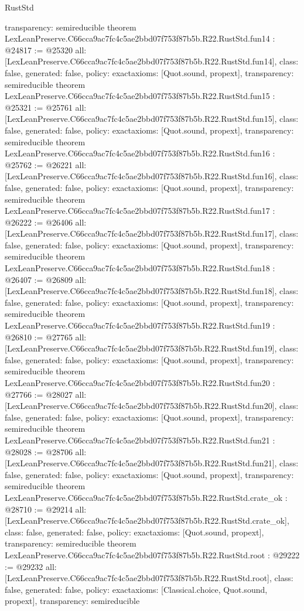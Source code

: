 \begin{lexlean}{RustStd}
\begin{coremodule}
{  transparency: semireducible
}
theorem LexLeanPreserve.C66cca9ac7fc4c5ae2bbd07f753f87b5b.R22.RustStd.fun14 : @24817 := @25320 {
  all: [LexLeanPreserve.C66cca9ac7fc4c5ae2bbd07f753f87b5b.R22.RustStd.fun14],
  class: false,
  generated: false,
  policy: exact{axioms: [Quot.sound, propext]},
  transparency: semireducible
}
theorem LexLeanPreserve.C66cca9ac7fc4c5ae2bbd07f753f87b5b.R22.RustStd.fun15 : @25321 := @25761 {
  all: [LexLeanPreserve.C66cca9ac7fc4c5ae2bbd07f753f87b5b.R22.RustStd.fun15],
  class: false,
  generated: false,
  policy: exact{axioms: [Quot.sound, propext]},
  transparency: semireducible
}
theorem LexLeanPreserve.C66cca9ac7fc4c5ae2bbd07f753f87b5b.R22.RustStd.fun16 : @25762 := @26221 {
  all: [LexLeanPreserve.C66cca9ac7fc4c5ae2bbd07f753f87b5b.R22.RustStd.fun16],
  class: false,
  generated: false,
  policy: exact{axioms: [Quot.sound, propext]},
  transparency: semireducible
}
theorem LexLeanPreserve.C66cca9ac7fc4c5ae2bbd07f753f87b5b.R22.RustStd.fun17 : @26222 := @26406 {
  all: [LexLeanPreserve.C66cca9ac7fc4c5ae2bbd07f753f87b5b.R22.RustStd.fun17],
  class: false,
  generated: false,
  policy: exact{axioms: [Quot.sound, propext]},
  transparency: semireducible
}
theorem LexLeanPreserve.C66cca9ac7fc4c5ae2bbd07f753f87b5b.R22.RustStd.fun18 : @26407 := @26809 {
  all: [LexLeanPreserve.C66cca9ac7fc4c5ae2bbd07f753f87b5b.R22.RustStd.fun18],
  class: false,
  generated: false,
  policy: exact{axioms: [Quot.sound, propext]},
  transparency: semireducible
}
theorem LexLeanPreserve.C66cca9ac7fc4c5ae2bbd07f753f87b5b.R22.RustStd.fun19 : @26810 := @27765 {
  all: [LexLeanPreserve.C66cca9ac7fc4c5ae2bbd07f753f87b5b.R22.RustStd.fun19],
  class: false,
  generated: false,
  policy: exact{axioms: [Quot.sound, propext]},
  transparency: semireducible
}
theorem LexLeanPreserve.C66cca9ac7fc4c5ae2bbd07f753f87b5b.R22.RustStd.fun20 : @27766 := @28027 {
  all: [LexLeanPreserve.C66cca9ac7fc4c5ae2bbd07f753f87b5b.R22.RustStd.fun20],
  class: false,
  generated: false,
  policy: exact{axioms: [Quot.sound, propext]},
  transparency: semireducible
}
theorem LexLeanPreserve.C66cca9ac7fc4c5ae2bbd07f753f87b5b.R22.RustStd.fun21 : @28028 := @28706 {
  all: [LexLeanPreserve.C66cca9ac7fc4c5ae2bbd07f753f87b5b.R22.RustStd.fun21],
  class: false,
  generated: false,
  policy: exact{axioms: [Quot.sound, propext]},
  transparency: semireducible
}
theorem LexLeanPreserve.C66cca9ac7fc4c5ae2bbd07f753f87b5b.R22.RustStd.crate_ok : @28710 := @29214 {
  all: [LexLeanPreserve.C66cca9ac7fc4c5ae2bbd07f753f87b5b.R22.RustStd.crate_ok],
  class: false,
  generated: false,
  policy: exact{axioms: [Quot.sound, propext]},
  transparency: semireducible
}
theorem LexLeanPreserve.C66cca9ac7fc4c5ae2bbd07f753f87b5b.R22.RustStd.root : @29222 := @29232 {
  all: [LexLeanPreserve.C66cca9ac7fc4c5ae2bbd07f753f87b5b.R22.RustStd.root],
  class: false,
  generated: false,
  policy: exact{axioms: [Classical.choice, Quot.sound, propext]},
  transparency: semireducible
}


\end{coremodule}
\end{lexlean}
